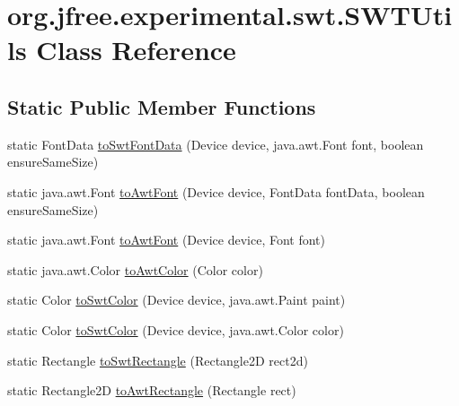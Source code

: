 \hypertarget{classorg_1_1jfree_1_1experimental_1_1swt_1_1_s_w_t_utils}{}\section{org.\+jfree.\+experimental.\+swt.\+S\+W\+T\+Utils Class Reference}
\label{classorg_1_1jfree_1_1experimental_1_1swt_1_1_s_w_t_utils}
\subsection*{Static Public Member Functions}
\begin{DoxyCompactItemize}
\item 
static Font\+Data \mbox{\hyperlink{classorg_1_1jfree_1_1experimental_1_1swt_1_1_s_w_t_utils_a706c8a8c41f1cdb1c6117b85d1aa12a4}{to\+Swt\+Font\+Data}} (Device device, java.\+awt.\+Font font, boolean ensure\+Same\+Size)
\item 
static java.\+awt.\+Font \mbox{\hyperlink{classorg_1_1jfree_1_1experimental_1_1swt_1_1_s_w_t_utils_aac8c26e7234d3252fda50cbb65ca143e}{to\+Awt\+Font}} (Device device, Font\+Data font\+Data, boolean ensure\+Same\+Size)
\item 
static java.\+awt.\+Font \mbox{\hyperlink{classorg_1_1jfree_1_1experimental_1_1swt_1_1_s_w_t_utils_ac1ba412afc48a81f2df9686b1ed45db6}{to\+Awt\+Font}} (Device device, Font font)
\item 
static java.\+awt.\+Color \mbox{\hyperlink{classorg_1_1jfree_1_1experimental_1_1swt_1_1_s_w_t_utils_aa5ae219eb60234a9f9259cabc5264de5}{to\+Awt\+Color}} (Color color)
\item 
static Color \mbox{\hyperlink{classorg_1_1jfree_1_1experimental_1_1swt_1_1_s_w_t_utils_a74249bb66f34e697822e9d94baf0e60a}{to\+Swt\+Color}} (Device device, java.\+awt.\+Paint paint)
\item 
static Color \mbox{\hyperlink{classorg_1_1jfree_1_1experimental_1_1swt_1_1_s_w_t_utils_aa2e7e30dffdbd5aca9a4663d5a013dd0}{to\+Swt\+Color}} (Device device, java.\+awt.\+Color color)
\item 
static Rectangle \mbox{\hyperlink{classorg_1_1jfree_1_1experimental_1_1swt_1_1_s_w_t_utils_a1315630eeb89b1518aec74e266282c71}{to\+Swt\+Rectangle}} (Rectangle2D rect2d)
\item 
static Rectangle2D \mbox{\hyperlink{classorg_1_1jfree_1_1experimental_1_1swt_1_1_s_w_t_utils_a61a35d94beb9c34c5ec5db2697e5a2a5}{to\+Awt\+Rectangle}} (Rectangle rect)

\end{DoxyCompactItemize}
